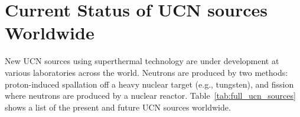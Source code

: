 











\section{Current Status of UCN sources Worldwide}
New UCN sources using superthermal technology are under development at
various laboratories across the world. Neutrons are produced by two
methods: proton-induced spallation off a heavy nuclear target (e.g.,
tungsten), and fission where neutrons are produced by a nuclear
reactor. Table~\ref{tab:full_ucn_sources}%
shows a list of the present and future UCN sources worldwide.




